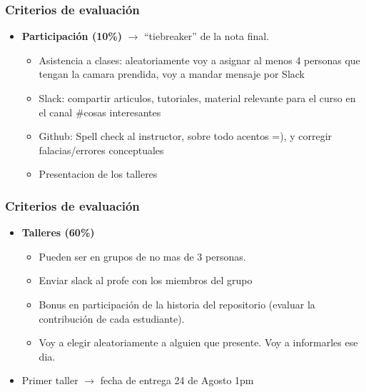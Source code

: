 \documentclass[
  shownotes,
  xcolor={svgnames},
  hyperref={colorlinks,citecolor=DarkBlue,linkcolor=DarkRed,urlcolor=DarkBlue}
  , aspectratio=169]{beamer}
\begin{document}
\begin{frame}
\frametitle{Criterios de evaluación}

\begin{itemize}
\item {\bf Participación (10\%)} $\rightarrow$ ``tiebreaker'' de la nota final. 
\medskip
  \begin{itemize}
    \item Asistencia a clases: aleatoriamente voy a asignar al menos 4 personas que tengan la camara prendida, voy a mandar mensaje por Slack
    \medskip
    \item Slack: compartir articulos, tutoriales, material relevante para el curso en el canal \#cosas interesantes
    \medskip
    \item Github: Spell check al instructor, sobre todo acentos =), y corregir falacias/errores conceptuales
    \medskip
    \item Presentacion de los talleres

  \end{itemize}
\end{itemize}

\end{frame}
\begin{frame}
\frametitle{Criterios de evaluación}
\begin{itemize}
  \item {\bf Talleres (60\%)}
  \bigskip
\begin{itemize}
  \item Pueden ser en grupos de no mas de 3 personas. 
  \medskip
  \item Enviar slack al profe con los miembros del grupo
  \medskip
  \item Bonus en participación de la historia del repositorio (evaluar la contribución de cada estudiante).
  \medskip
  \item Voy a elegir aleatoriamente a alguien que presente. Voy a informarles ese dia.
  \end{itemize}
\bigskip

   \item Primer taller $\rightarrow$ fecha de entrega 24 de Agosto 1pm
   
\end{itemize}

\end{frame}
\end{document}
